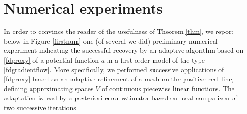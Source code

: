 
\section{Numerical experiments}\label{sec:num}
In order to convince the reader of the usefulness of Theorem \ref{thm}, we report below in Figure \ref{firstnum} one (of several we did) preliminary numerical experiment  indicating the successful recovery by an adaptive algorithm based on \eqref{fdproxy} of a potential function $a$ in a first order model of the type \eqref{fdgradientflow}. More specifically, we performed successive applications of  \eqref{fdproxy} based on an adaptive refinement of a mesh on the positive real line, defining approximating spaces $V$ of continuous piecewise linear functions. The adaptation is lead by a posteriori error estimator based on local comparison of two successive iterations.


